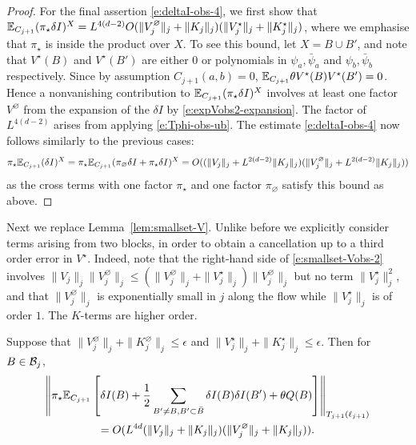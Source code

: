\documentclass[11pt]{amsart}
\numberwithin{equation}{section}
\numberwithin{theorem}{section}
\newcommand{\1}{{\bf 1}}
\newcommand{\obs}{\star}
\newcommand{\Vbulk}{V^\varnothing}
\newcommand{\Vobs}{V^\obs}
\newcommand{\Kobs}{K^\obs}
\begin{document}
\begin{proof}
  For the final assertion \eqref{e:deltaI-obs-4}, we first show that
  $\E_{C_{j+1}}(\pi_\obs\delta I)^X=L^{4(d-2)}O(\|\Vbulk_j\|_j +
  \|K_j\|_j)(\|\Vobs_j\|_j + \|\Kobs_j\|_j)$, where we emphasise that
  $\pi_\obs$ is inside the product over $X$.  To see this bound,
  let $X = B\cup B'$, and note that $V^\obs(B)$ and
  $V^\obs(B')$ are either $0$ or polynomials in $\psi_a,\bar\psi_a$
  and $\psi_b,\bar\psi_b$ respectively.  Since by assumption
  $C_{j+1}(a, b)=0$, 
    $\E_{C_{j+1}}\theta V^{\obs}(B) V^{\obs}(B') =0$. Hence a
  nonvanishing contribution to $\E_{C_{j+1}}(\pi_\obs\delta I)^X$
  involves at least one factor $\Vbulk$ from the expansion of the
  $\delta I$ by \eqref{e:expVobs2-expansion}. The factor of
  $L^{4(d-2)}$ arises from applying \eqref{e:Tphi-obs-ub}.
% 
  The estimate \eqref{e:deltaI-obs-4} now follows similarly to
  the previous cases: 
  \begin{equation}
    \pi_\obs \E_{C_{j+1}}( \delta I)^X
    =\pi_\obs \E_{C_{j+1}}( \pi_\varnothing \delta I + \pi_\obs \delta I)^X
    =O((\|V_j\|_j + L^{2(d-2)}\|K_j\|_j)(\|\Vbulk_j\|_j + L^{2(d-2)}\|K_j\|_j))
  \end{equation}  
  as the cross terms with one factor $\pi_{\obs}$ and one factor
  $\pi_{\varnothing}$ satisfy this bound as above.
\end{proof}

Next we replace Lemma~\ref{lem:smallset-V}. Unlike before we
explicitly consider terms arising from two blocks,
in order to obtain a cancellation up to a third order error in $\Vobs$.
Indeed, note that the right-hand side of   \eqref{e:smallset-Vobs-2} involves
$\|V_j\|_j\|\Vbulk_j\|_j \leq (\|\Vbulk_j\|_j+\|\Vobs_j\|_j)\|\Vbulk_j\|_j$ but no term $\|\Vobs_j\|_j^2$,
and that $\|\Vbulk_j\|_j$ is exponentially small in $j$ along the flow while $\|\Vobs_j\|_j$ is of order $1$. The $K$-terms are higher order.

\begin{lemma} \label{lem:smallset-Vobs}
  Suppose that $\|V_j^\varnothing \|_j+\|K_{j}^\varnothing\|_j\leq\epsilon$
  and $\|\Vobs_{j}\|_{j}+\|\Kobs_{j}\|_{j}\leq \epsilon$.
  Then for $B\in \mathcal B_j$, 
  \begin{multline}
  \label{e:smallset-Vobs-2}
  \norma{\pi_\obs \E_{C_{j+1}}\qa{\delta I(B)+ \frac12
      \sum_{B' \neq  B, B'\subset \bar{B}}
   \delta I(B) \delta I(B') + \theta Q(B)}}_{T_{j+1}(\ell_{j+1})}
  \\
  = O(L^{4d}
  (\|V_{j}\|_{j}+\|K_{j}\|_j)
  (\|\Vbulk_j\|_j+\|K_{j}\|_{j})).
  \end{multline}
\end{lemma}
\end{document}
